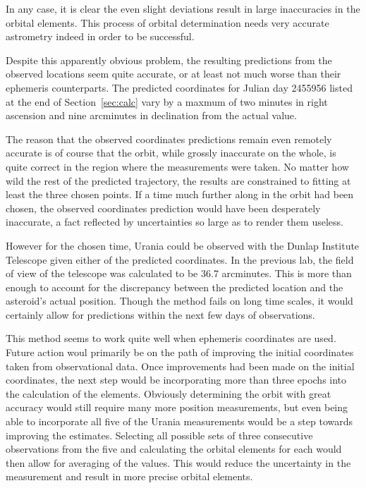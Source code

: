 \documentclass[a4paper,12pt]{article}
\begin{document}
In any case, it is clear the even slight deviations result in large inaccuracies in the orbital elements. This process of orbital determination needs very accurate astrometry indeed in order to be successful.

Despite this apparently obvious problem, the resulting predictions from the observed locations seem quite accurate, or at least not much worse than their ephemeris counterparts. The predicted coordinates for Julian day 2455956 listed at the end of Section~\ref{sec:calc} vary by a maxmum of two minutes in right ascension and nine arcminutes in declination from the actual value. 

The reason that the observed coordinates predictions remain even remotely accurate is of course that the orbit, while grossly inaccurate on the whole, is quite correct in the region where the measurements were taken. No matter how wild the rest of the predicted trajectory, the results are constrained to fitting at least the three chosen points. If a time much further along in the orbit had been chosen, the observed coordinates prediction would have been desperately inaccurate, a fact reflected by uncertainties so large as to render them useless.

However for the chosen time, Urania could be observed with the Dunlap Institute Telescope given either of the predicted coordinates. In the previous lab, the field of view of the telescope was calculated to be 36.7 arcminutes. This is more than enough to account for the discrepancy between the predicted location and the asteroid's actual position. Though the method fails on long time scales, it would certainly allow for predictions within the next few days of observations.

This method seems to work quite well when ephemeris coordinates are used. Future action woul primarily be on the path of improving the initial coordinates taken from observational data. Once improvements had been made on the initial coordinates, the next step would be incorporating more than three epochs into the calculation of the elements. Obviously determining the orbit with great accuracy would still require many more position measurements, but even being able to incorporate all five of the Urania measurements would be a step towards improving the estimates. Selecting all possible sets of three consecutive observations from the five and calculating the orbital elements for each would then allow for averaging of the values. This would reduce the uncertainty in the measurement and result in more precise orbital elements.
\end{document}
